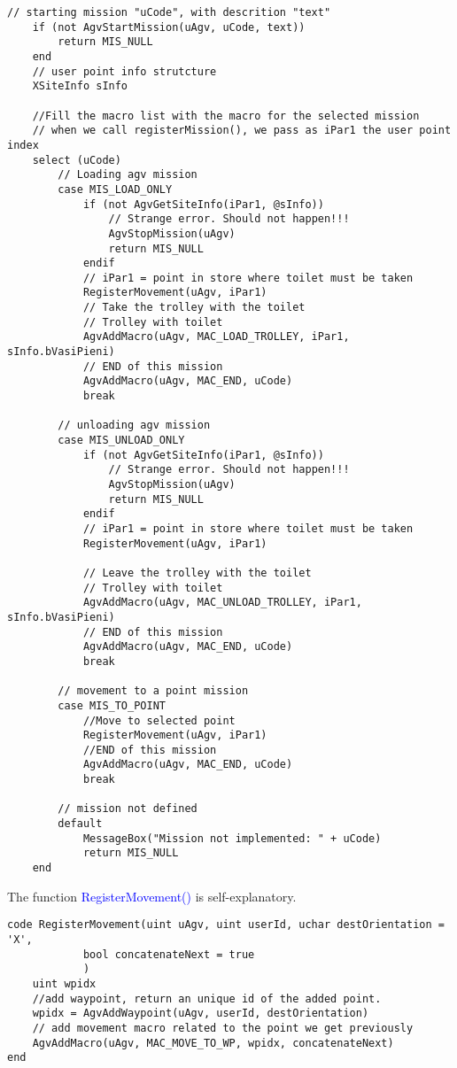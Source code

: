 \begin{lstlisting}[caption=RegisterMission() code fragment, label=lstRegisterMission]
	// starting mission "uCode", with descrition "text"
	if (not AgvStartMission(uAgv, uCode, text))
		return MIS_NULL
	end
	// user point info strutcture
	XSiteInfo sInfo
	
	//Fill the macro list with the macro for the selected mission
	// when we call registerMission(), we pass as iPar1 the user point index
	select (uCode)
		// Loading agv mission
		case MIS_LOAD_ONLY
			if (not AgvGetSiteInfo(iPar1, @sInfo))
				// Strange error. Should not happen!!!
				AgvStopMission(uAgv)
				return MIS_NULL
			endif
			// iPar1 = point in store where toilet must be taken
			RegisterMovement(uAgv, iPar1)
			// Take the trolley with the toilet
			// Trolley with toilet
			AgvAddMacro(uAgv, MAC_LOAD_TROLLEY, iPar1, sInfo.bVasiPieni)
			// END of this mission
			AgvAddMacro(uAgv, MAC_END, uCode)
			break
			
		// unloading agv mission
		case MIS_UNLOAD_ONLY
			if (not AgvGetSiteInfo(iPar1, @sInfo))
				// Strange error. Should not happen!!!
				AgvStopMission(uAgv)
				return MIS_NULL
			endif
			// iPar1 = point in store where toilet must be taken
			RegisterMovement(uAgv, iPar1)
			
			// Leave the trolley with the toilet
			// Trolley with toilet
			AgvAddMacro(uAgv, MAC_UNLOAD_TROLLEY, iPar1, sInfo.bVasiPieni)
			// END of this mission
			AgvAddMacro(uAgv, MAC_END, uCode)
			break
		
		// movement to a point mission
		case MIS_TO_POINT
			//Move to selected point
			RegisterMovement(uAgv, iPar1)
			//END of this mission
			AgvAddMacro(uAgv, MAC_END, uCode)
			break
			
		// mission not defined
		default
			MessageBox("Mission not implemented: " + uCode)
			return MIS_NULL
	end

\end{lstlisting}

The function \textcolor{blue}{RegisterMovement()} is self-explanatory.

\begin{lstlisting}[caption=RegisterMovement() function,label=lstRegisterMovment]
code RegisterMovement(uint uAgv, uint userId, uchar destOrientation = 'X',
			bool concatenateNext = true
			)
	uint wpidx
	//add waypoint, return an unique id of the added point.
	wpidx = AgvAddWaypoint(uAgv, userId, destOrientation)
	// add movement macro related to the point we get previously
	AgvAddMacro(uAgv, MAC_MOVE_TO_WP, wpidx, concatenateNext)
end
\end{lstlisting}

